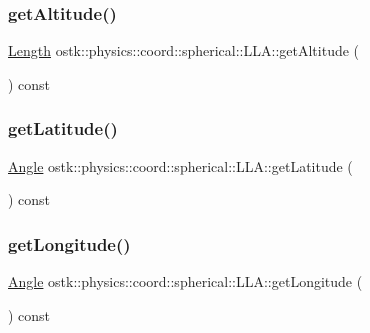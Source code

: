\subsubsection{\texorpdfstring{get\+Altitude()}{getAltitude()}}
{\footnotesize\ttfamily \hyperlink{classostk_1_1physics_1_1units_1_1_length}{Length} ostk\+::physics\+::coord\+::spherical\+::\+L\+L\+A\+::get\+Altitude (\begin{DoxyParamCaption}{ }\end{DoxyParamCaption}) const}

\mbox{\label{classostk_1_1physics_1_1coord_1_1spherical_1_1_l_l_a_a0b6d5f7409e1efbff0f01a9c00a876e8}} 
\subsubsection{\texorpdfstring{get\+Latitude()}{getLatitude()}}
{\footnotesize\ttfamily \hyperlink{classostk_1_1physics_1_1units_1_1_angle}{Angle} ostk\+::physics\+::coord\+::spherical\+::\+L\+L\+A\+::get\+Latitude (\begin{DoxyParamCaption}{ }\end{DoxyParamCaption}) const}

\mbox{\label{classostk_1_1physics_1_1coord_1_1spherical_1_1_l_l_a_aa031e4c4f1078cec374f0d4b0cc6e20d}} 
\subsubsection{\texorpdfstring{get\+Longitude()}{getLongitude()}}
{\footnotesize\ttfamily \hyperlink{classostk_1_1physics_1_1units_1_1_angle}{Angle} ostk\+::physics\+::coord\+::spherical\+::\+L\+L\+A\+::get\+Longitude (\begin{DoxyParamCaption}{ }\end{DoxyParamCaption}) const}

